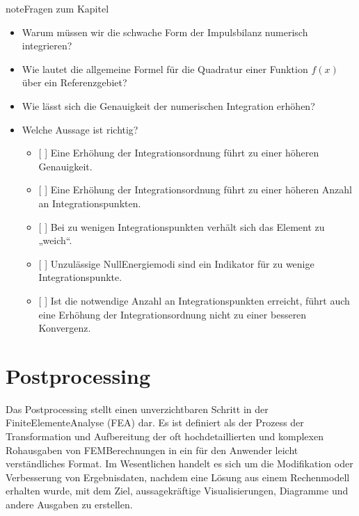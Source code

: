\documentclass[letterpaper,10pt,german]{jupyterBook}
\begin{document}
\begin{sphinxadmonition}{note}{Fragen zum Kapitel}

\sphinxAtStartPar
{}
\begin{itemize}
\item {} 
\sphinxAtStartPar
Warum müssen wir die schwache Form der Impulsbilanz numerisch integrieren?

\item {} 
\sphinxAtStartPar
Wie lautet die allgemeine Formel für die Quadratur einer Funktion \(f(x)\) über ein Referenzgebiet?

\item {} 
\sphinxAtStartPar
Wie lässt sich die Genauigkeit der numerischen Integration erhöhen?

\item {} 
\sphinxAtStartPar
Welche Aussage ist richtig?
\begin{itemize}
\item {} 
\sphinxAtStartPar
{[} {]} Eine Erhöhung der Integrationsordnung führt zu einer höheren Genauigkeit.

\item {} 
\sphinxAtStartPar
{[} {]} Eine Erhöhung der Integrationsordnung führt zu einer höheren Anzahl an Integrationspunkten.

\item {} 
\sphinxAtStartPar
{[} {]} Bei zu wenigen Integrationspunkten verhält sich das Element zu „weich“.

\item {} 
\sphinxAtStartPar
{[} {]} Unzulässige Null\sphinxhyphen{}Energiemodi sind ein Indikator für zu wenige Integrationspunkte.

\item {} 
\sphinxAtStartPar
{[} {]} Ist die notwendige Anzahl an Integrationspunkten erreicht, führt auch eine Erhöhung der Integrationsordnung nicht zu einer besseren Konvergenz.

\end{itemize}

\end{itemize}
\end{sphinxadmonition}

\sphinxstepscope


\section{Postprocessing}
\label{\detokenize{chapters/chapter3/Postprocessing:postprocessing}}\label{\detokenize{chapters/chapter3/Postprocessing::doc}}
\sphinxAtStartPar
Das Postprocessing stellt einen unverzichtbaren Schritt in der Finite\sphinxhyphen{}Elemente\sphinxhyphen{}Analyse (FEA) dar. Es ist definiert als der Prozess der Transformation und Aufbereitung der oft hochdetaillierten und komplexen Rohausgaben von FEM\sphinxhyphen{}Berechnungen in ein für den Anwender leicht verständliches Format. Im Wesentlichen handelt es sich um die Modifikation oder Verbesserung von Ergebnisdaten, nachdem eine Lösung aus einem Rechenmodell erhalten wurde, mit dem Ziel, aussagekräftige Visualisierungen, Diagramme und andere Ausgaben zu erstellen.
\end{document}
